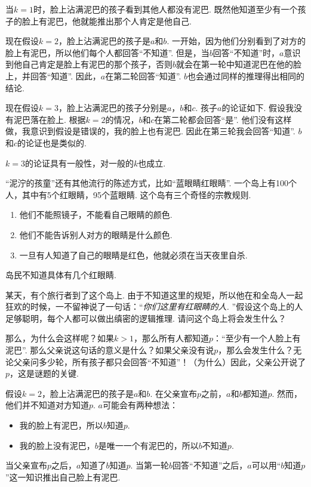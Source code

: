 当$k=1$时，脸上沾满泥巴的孩子看到其他人都没有泥巴. 既然他知道至少有一个孩子的脸上有泥巴，他就能推出那个人肯定是他自己. 

现在假设$k=2$，脸上沾满泥巴的孩子是$a$和$b$. 一开始，因为他们分别看到了对方的脸上有泥巴，所以他们每个人都回答“不知道”. 但是，当$b$回答“不知道”时，$a$意识到他自己肯定是脸上有泥巴的那个孩子，否则$b$就会在第一轮中知道泥巴在他的脸上，并回答“知道”. 因此，$a$在第二轮回答“知道”. $b$也会通过同样的推理得出相同的结论. 

 现在假设$k=3$，脸上沾满泥巴的孩子分别是$a$，$b$和$c$. 孩子$a$的论证如下. 假设我没有泥巴落在脸上. 根据$k=2$的情况，$b$和$c$在第二轮都会回答“是”. 他们没有这样做，我意识到假设是错误的，我的脸上也有泥巴. 因此在第三轮我会回答“知道”. $b$和$c$的论证也是类似的.

$k=3$的论证具有一般性，对一般的$k$也成立.

\begin{remark}
“泥泞的孩童”还有其他流行的陈述方式，比如“蓝眼睛红眼睛”. 一个岛上有100个人，其中有5个红眼睛，95个蓝眼睛. 这个岛有三个奇怪的宗教规则.
    \begin{enumerate}
        \item 他们不能照镜子，不能看自己眼睛的颜色. 
        \item 他们不能告诉别人对方的眼睛是什么颜色. 
        \item 一旦有人知道了自己的眼睛是红色，他就必须在当天夜里自杀.
    \end{enumerate}
岛民不知道具体有几个红眼睛. 

某天，有个旅行者到了这个岛上. 由于不知道这里的规矩，所以他在和全岛人一起狂欢的时候，一不留神说了一句话：“\emph{你们这里有红眼睛的人. }”假设这个岛上的人足够聪明，每个人都可以做出缜密的逻辑推理. 请问这个岛上将会发生什么？
\end{remark}

那么，为什么会这样呢？如果$k>1$，那么所有人都知道$p$：“至少有一个人脸上有泥巴”. 那么父亲说这句话的意义是什么？如果父亲没有说$p$，那么会发生什么？无论父亲问多少轮，所有孩子都只会回答“不知道”！（为什么）因此，父亲公开说了$p$，这是谜题的关键.

假设$k=2$，脸上沾满泥巴的孩子是$a$和$b$. 在父亲宣布$p$之前，$a$和$b$都知道$p$. 然而，他们并不知道对方知道$p$. $a$可能会有两种想法：
    \begin{itemize}
        \item 我的脸上有泥巴，所以$b$知道$p$.
        \item 我的脸上没有泥巴，$b$是唯一一个有泥巴的，所以$b$不知道$p$.
    \end{itemize}
当父亲宣布$p$之后，$a$知道了$b$知道$p$. 当第一轮$b$回答“不知道”之后，$a$可以用“$b$知道$p$”这一知识推出自己脸上有泥巴.


